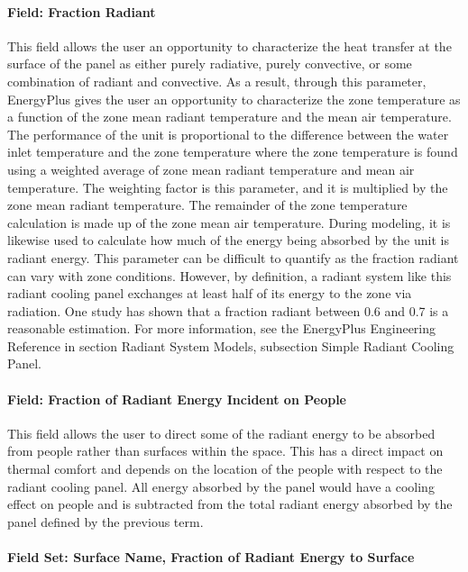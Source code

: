 \paragraph{Field: Fraction Radiant}\label{field-fraction-radiant-2-000-1}

This field allows the user an opportunity to characterize the heat transfer at the surface of the panel as either purely radiative, purely convective, or some combination of radiant and convective.  As a result, through this parameter, EnergyPlus gives the user an opportunity to characterize the zone temperature as a function of the zone mean radiant temperature and the mean air temperature.  The performance of the unit is proportional to the difference between the water inlet temperature and the zone temperature where the zone temperature is found using a weighted average of zone mean radiant temperature and mean air temperature.  The weighting factor is this parameter, and it is multiplied by the zone mean radiant temperature.  The remainder of the zone temperature calculation is made up of the zone mean air temperature.  During modeling, it is likewise used to calculate how much of the energy being absorbed by the unit is radiant energy.  This parameter can be difficult to quantify as the fraction radiant can vary with zone conditions.  However, by definition, a radiant system like this radiant cooling panel exchanges at least half of its energy to the zone via radiation.  One study has shown that a fraction radiant between 0.6 and 0.7 is a reasonable estimation.  For more information, see the EnergyPlus Engineering Reference in section Radiant System Models, subsection Simple Radiant Cooling Panel.

\paragraph{Field: Fraction of Radiant Energy Incident on People}\label{field-fraction-of-radiant-energy-incident-on-people-2-1}

This field allows the user to direct some of the radiant energy to be absorbed from people rather than surfaces within the space.  This has a direct impact on thermal comfort and depends on the location of the people with respect to the radiant cooling panel.  All energy absorbed by the panel would have a cooling effect on people and is subtracted from the total radiant energy absorbed by the panel defined by the previous term.

\paragraph{Field Set: Surface Name, Fraction of Radiant Energy to Surface}\label{field-set-surface-name-fraction-of-radiant-energy-to-surface-2-1}

